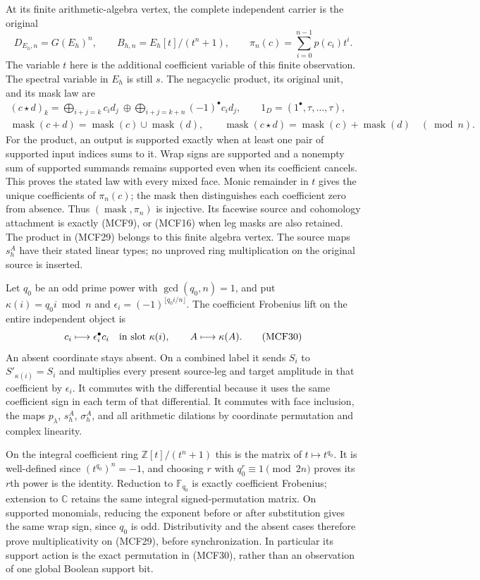 \documentclass[11pt,a4paper]{article}
\begin{document}
At its finite arithmetic-algebra vertex, the complete independent carrier
is the original
\[
D_{E_h,n}=G(E_h)^n,\qquad B_{h,n}=E_h[t]/(t^n+1),\qquad
\pi_n(c)=\sum_{i=0}^{n-1}p(c_i)t^i.
\tag{MCF28}
\]
The variable $t$ here is the additional coefficient variable of this
finite observation.  The spectral variable in $E_h$ is still $s$.
The negacyclic product, its original unit, and its mask law are
\[
\begin{gathered}
(c\star d)_k=\mathop{\bigoplus}_{i+j=k}c_id_j\ \oplus\!
             \mathop{\bigoplus}_{i+j=k+n}(-1)^\bullet c_id_j,
\qquad 1_D=(1^\bullet,\tau,\ldots,\tau),\\
\operatorname{mask}(c+d)=\operatorname{mask}(c)\cup\operatorname{mask}(d),\qquad
\operatorname{mask}(c\star d)
 =\operatorname{mask}(c)+\operatorname{mask}(d)\quad(\bmod n).
\end{gathered}
\tag{MCF29}
\]
For the product, an output is supported exactly when at least one pair
of supported input indices sums to it.  Wrap signs are supported and a
nonempty sum of supported summands remains supported even when its
coefficient cancels.  This proves the stated law with every mixed face.
Monic remainder in $t$ gives the unique coefficients of $\pi_n(c)$;
the mask then distinguishes each coefficient zero from absence.  Thus
$(\operatorname{mask},\pi_n)$ is injective.  Its facewise source and
cohomology attachment is exactly (MCF9), or (MCF16) when leg masks are
also retained.  The product in (MCF29) belongs to this finite algebra
vertex.  The source maps $s_h^A$ have their stated linear types; no
unproved ring multiplication on the original source is inserted.

Let $q_0$ be an odd prime power with $\gcd(q_0,n)=1$, and put
$\kappa(i)=q_0i\bmod n$ and
$\epsilon_i=(-1)^{\lfloor q_0i/n\rfloor}$.  The coefficient Frobenius
lift on the entire independent object is
\[
c_i\longmapsto\epsilon_i^\bullet c_i
       \quad\hbox{in slot }\kappa(i),\qquad
A\longmapsto\kappa(A).
\tag{MCF30}
\]
An absent coordinate stays absent.  On a combined label it sends
$S_i$ to $S'_{\kappa(i)}=S_i$ and multiplies every present source-leg
and target amplitude in that coefficient by $\epsilon_i$.  It commutes
with the differential because it uses the same coefficient sign in
each term of that differential.  It commutes with face inclusion,
the maps $p_\lambda$, $s_h^A$, $\sigma_h^A$, and all arithmetic dilations
by coordinate permutation and complex linearity.

On the integral coefficient ring $\mathbb Z[t]/(t^n+1)$ this is the
matrix of $t\mapsto t^{q_0}$.  It is well-defined since
$(t^{q_0})^n=-1$, and choosing $r$ with $q_0^r\equiv1\pmod{2n}$
proves its $r$th power is the identity.  Reduction to $\mathbb F_{q_0}$
is exactly coefficient Frobenius; extension to $\mathbb C$ retains the
same integral signed-permutation matrix.  On supported monomials,
reducing the exponent before or after substitution gives the same
wrap sign, since $q_0$ is odd.  Distributivity and the absent cases
therefore prove multiplicativity on (MCF29), before synchronization.
In particular its support action is the exact permutation in (MCF30),
rather than an observation of one global Boolean support bit.
\end{document}
